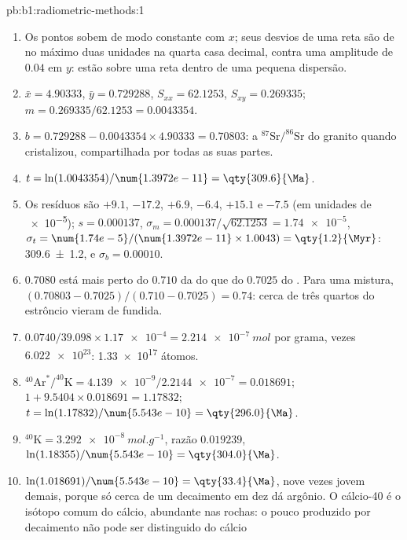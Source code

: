 \begin{solution}{pb:b1:radiometric-methods:1}
\begin{enumerate}
  \item Os pontos sobem de modo constante com $x$; seus desvios de uma reta são de no máximo
        duas unidades na quarta casa decimal, contra uma amplitude de $0.04$ em $y$: estão sobre
        uma reta dentro de uma pequena dispersão.
  \item $\bar x = 4.90333$, $\bar y = 0.729288$, $S_{xx} = 62.1253$, $S_{xy} =
        0.269335$; $m = 0.269335/62.1253 = 0.0043354$.
  \item $b = 0.729288 - 0.0043354 \times 4.90333 = 0.70803$: a $^{87}\mathrm{Sr}/^{86}\mathrm{Sr}$
        do granito quando cristalizou, compartilhada por todas as suas partes.
  \item $t = \ln(1.0043354)/\num{1.3972e-11} = \qty{309.6}{\Ma}$.
  \item Os resíduos são $+9.1$, $-17.2$, $+6.9$, $-6.4$, $+15.1$ e $-7.5$ (em unidades de
        \num{e-5}); $s = 0.000137$, $\sigma_m = 0.000137/\sqrt{62.1253} =
        \num{1.74e-5}$, $\sigma_t = \num{1.74e-5}/(\num{1.3972e-11} \times 1.0043)
        = \qty{1.2}{\Myr}$: \qty[uncertainty-mode=separate]{309.6(12)}{\Ma}, e
        $\sigma_b = 0.00010$.
  \item $0.7080$ está mais perto do $0.710$ da  do que do $0.7025$ do . Para uma
        mistura, $(0.70803 - 0.7025)/(0.710 - 0.7025) = 0.74$: cerca de três quartos do
        estrôncio vieram de  fundida.
  \item $0.0740/39.098 \times \num{1.17e-4} = \qty{2.214e-7}{mol}$ por grama, vezes
        $\num{6.022e23}$: \num{1.33e17} átomos.
  \item $^{40}\mathrm{Ar}^*/^{40}\mathrm{K} = \num{4.139e-9}/\num{2.2144e-7} =
        0.018691$; $1 + 9.5404 \times 0.018691 = 1.17832$; $t =
        \ln(1.17832)/\num{5.543e-10} = \qty{296.0}{\Ma}$.
  \item $^{40}\mathrm{K} = \qty{3.292e-8}{mol.g^{-1}}$, razão $0.019239$,
        $\ln(1.18355)/\num{5.543e-10} = \qty{304.0}{\Ma}$.
  \item $\ln(1.018691)/\num{5.543e-10} = \qty{33.4}{\Ma}$, nove vezes jovem demais, porque só
        cerca de um decaimento em dez dá argônio. O cálcio-40 é o isótopo comum do cálcio,
        abundante nas rochas: o pouco produzido por decaimento não pode ser distinguido do cálcio

\end{enumerate}
\end{solution}
